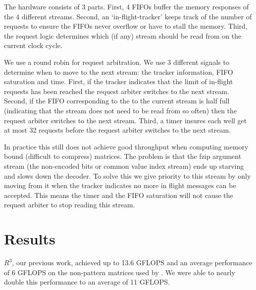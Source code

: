 The hardware consists of 3 parts. First, 4 FIFOs buffer the memory responses of the 4 different streams. Second, an `in-flight-tracker' keeps track of the number of requests to ensure the FIFOs never overflow or have to stall the memory. Third, the request logic determines which (if any) stream should be read from on the current clock cycle.

We use a round robin for request arbitration. We use 3 different signals to determine when to move to the next stream: the tracker information, FIFO saturation and time. First, if the tracker indicates that the limit of in-flight requests has been reached the request arbiter switches to the next stream. Second, if the FIFO corresponding to the to the current stream is half full (indicating that the stream does not need to be read from so often) then the request arbiter switches to the next stream. Third, a timer insures each well get at most 32 requests before the request arbiter switches to the next stream.

\par In practice this still does not achieve good throughput when computing memory bound (difficult to compress) matrices. The problem is that the fzip argument stream (the non-encoded bits or common value index stream) ends up starving and slows down the decoder. To solve this we give priority to this stream by only moving from it when the tracker indicates no more in flight messages can be accepted. This means the timer and the FIFO saturation will not cause the request arbiter to stop reading this stream.
\section{Results}
$R^3$, our previous work, achieved up to 13.6 GFLOPS and an average performance of 6 GFLOPS on the non-pattern matrices used by \cite{prelim:bell}. We were able to nearly double this performance to an average of 11 GFLOPS.

